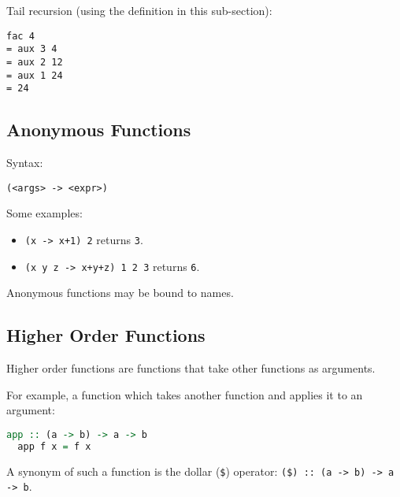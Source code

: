 Tail recursion (using the definition in this sub-section):
\begin{verbatim}
fac 4
= aux 3 4
= aux 2 12
= aux 1 24
= 24
\end{verbatim}

\subsection{Anonymous Functions}
Syntax:
\begin{center}
  \texttt{(<args> -> <expr>)}
\end{center}

Some examples:
\begin{itemize}
  \item \texttt{(x -> x+1) 2} returns \texttt{3}.
  \item \texttt{(x y z -> x+y+z) 1 2 3} returns \texttt{6}.
\end{itemize}
Anonymous functions may be bound to names.

\subsection{Higher Order Functions}
Higher order functions are functions that take other functions as arguments.

For example, a function which takes another function and applies it to an argument:
\begin{lstlisting}[language=haskell]
  app :: (a -> b) -> a -> b
  app f x = f x
\end{lstlisting}
A synonym of such a function is the dollar (\texttt{\$}) operator: \texttt{(\$) :: (a -> b) -> a -> b}.

